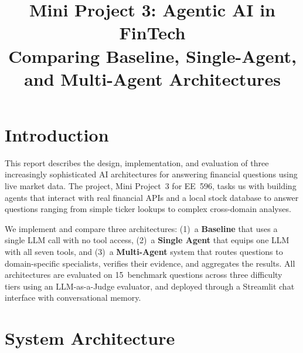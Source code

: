 \documentclass[conference]{IEEEtran}
\begin{document}
\title{Mini Project 3: Agentic AI in FinTech\\Comparing Baseline, Single-Agent, and Multi-Agent Architectures}

\author{
\and
{}
}

\maketitle

\section{Introduction}

This report describes the design, implementation, and evaluation of three increasingly
sophisticated AI architectures for answering financial questions using live market data.
The project, Mini Project~3 for EE~596, tasks us with building agents that interact with
real financial APIs and a local stock database to answer questions ranging from simple
ticker lookups to complex cross-domain analyses.

We implement and compare three architectures: (1)~a \textbf{Baseline} that uses a single
LLM call with no tool access, (2)~a \textbf{Single Agent} that equips one LLM with all
seven tools, and (3)~a \textbf{Multi-Agent} system that routes questions to domain-specific
specialists, verifies their evidence, and aggregates the results.  All architectures are
evaluated on 15~benchmark questions across three difficulty tiers using an LLM-as-a-Judge
evaluator, and deployed through a Streamlit chat interface with conversational memory.

\section{System Architecture}
\end{document}
